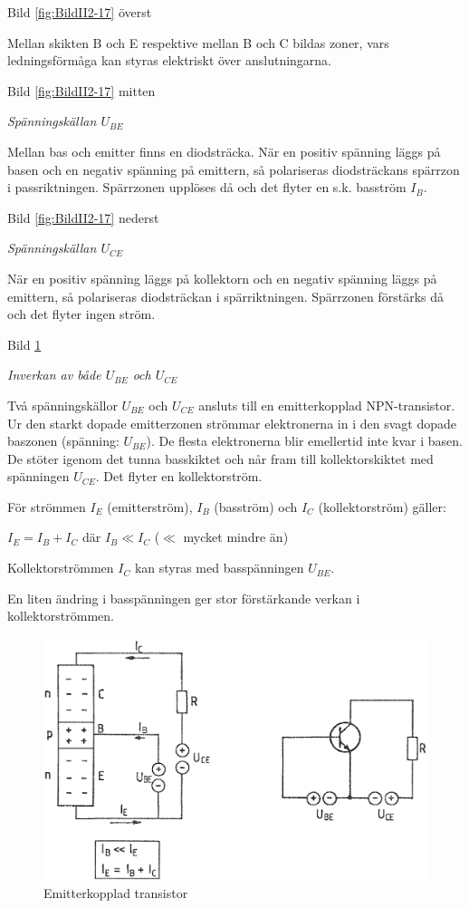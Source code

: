 Bild \ref{fig:BildII2-17} överst

Mellan skikten B och E respektive mellan B och C bildas zoner, vars
ledningsförmåga kan styras elektriskt över anslutningarna.

Bild \ref{fig:BildII2-17} mitten

\emph{Spänningskällan \(U_{BE}\)}

Mellan bas och emitter finns en diodsträcka. När en positiv spänning läggs på
basen och en negativ spänning på emittern, så polariseras diodsträckans spärrzon
i passriktningen. Spärrzonen upplöses då och det flyter en s.k. basström
\(I_B\).

Bild \ref{fig:BildII2-17} nederst

\emph{Spänningskällan \(U_{CE}\)}

När en positiv spänning läggs på kollektorn och en negativ spänning läggs på
emittern, så polariseras diodsträckan i spärriktningen. Spärrzonen förstärks då
och det flyter ingen ström.

Bild \ref{fig:BildII2-18}

\emph{Inverkan av både \(U_{BE}\) och \(U_{CE}\)}

Två spänningskällor \(U_{BE}\) och \(U_{CE}\) ansluts till en emitterkopplad NPN-transistor.
Ur den starkt dopade emitterzonen strömmar elektronerna in i den svagt dopade
baszonen (spänning: \(U_{BE}\)). De flesta elektronerna blir emellertid inte
kvar i basen. De stöter igenom det tunna basskiktet och når fram till
kollektorskiktet med spänningen \(U_{CE}\). Det flyter en kollektorström.

För strömmen \(I_E\) (emitterström), \(I_B\) (basström) och \(I_C\)
(kollektorström) gäller:

\(I_E = I_B + I_C\) där \(I_B \ll I_C\) (\(\ll\) mycket mindre än)

Kollektorströmmen \(I_C\) kan styras med basspänningen \(U_{BE}\).

En liten ändring i basspänningen ger stor förstärkande verkan i
kollektorströmmen.

\begin{figure}
\includegraphics[width=\textwidth]{images/cropped_pdfs/bild_2_2-18.pdf}
\caption{Emitterkopplad transistor}
\label{fig:BildII2-18}
\end{figure}

